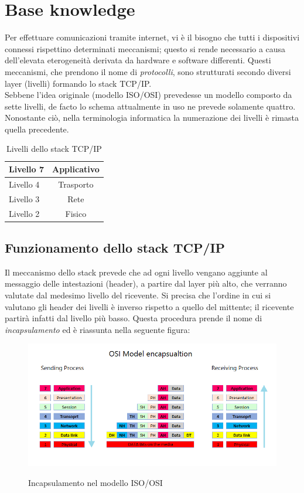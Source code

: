 \chapter{Base knowledge}

Per effettuare comunicazioni tramite internet, vi è il bisogno che tutti i dispositivi connessi rispettino determinati meccanismi; questo si rende necessario a causa dell'elevata eterogeneità derivata da hardware e software differenti.
Questi meccanismi, che prendono il nome di \textit{protocolli}, sono strutturati secondo diversi layer (livelli) formando lo stack TCP/IP.  \\
Sebbene l'idea originale (modello ISO/OSI) prevedesse un modello composto da sette livelli, de facto lo schema attualmente in uso ne prevede solamente quattro. Nonostante ciò, nella terminologia informatica la numerazione dei livelli è rimasta quella precedente.
\\
\begin{table}[htb]
	\centering
	\begin{tabular}{| l | c |}
		\hline
		Livello 7 & Applicativo
		\\
		\hline
		Livello 4 & Trasporto
		\\
		\hline
		Livello 3 & Rete
		\\
		\hline
		Livello 2 & Fisico
		\\
		\hline
		
	\end{tabular}
	\caption{Livelli dello stack TCP/IP}
	\label{tab:stack}
\end{table}

\section{Funzionamento dello stack TCP/IP}
Il meccanismo dello stack prevede che ad ogni livello vengano aggiunte al messaggio delle intestazioni (header), a partire dal layer più alto, che verranno valutate dal medesimo livello del ricevente.
Si precisa che l'ordine in cui si valutano gli header dei livelli è inverso rispetto a quello del mittente; il ricevente partirà infatti dal livello più basso.
Questa procedura prende il nome di \textit{incapsulamento} ed è riassunta nella seguente figura:


\begin{figure}[h]
	\centering
	\includegraphics[width=\textwidth]{figures/incapsulamento.png}
	\caption{Incapsulamento nel modello ISO/OSI}
	\label{incapsulamento}
	\cite{incapsulamento}
\end{figure}

